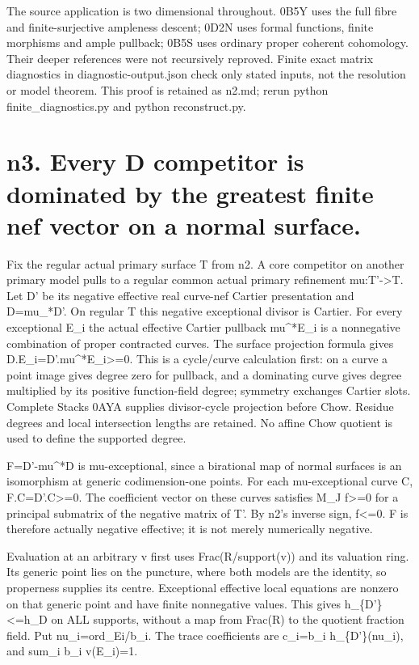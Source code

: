 \documentclass[11pt]{article}
\begin{document}
The source application is two dimensional throughout. 0B5Y uses the full fibre and finite-surjective ampleness descent; 0D2N uses formal functions, finite morphisms and ample pullback; 0B5S uses ordinary proper coherent cohomology. Their deeper references were not recursively reproved. Finite exact matrix diagnostics in diagnostic-output.json check only stated inputs, not the resolution or model theorem. This proof is retained as n2.md; rerun python finite\_diagnostics.py and python reconstruct.py.

\section*{n3. Every D competitor is dominated by the greatest finite nef vector on a normal surface.}
Fix the regular actual primary surface T from n2. A core competitor on another primary model pulls to a regular common actual primary refinement mu:T'->T. Let D' be its negative effective real curve-nef Cartier presentation and D=mu\_*D'. On regular T this negative exceptional divisor is Cartier. For every exceptional E\_i the actual effective Cartier pullback mu\textasciicircum{}*E\_i is a nonnegative combination of proper contracted curves. The surface projection formula gives D.E\_i=D'.mu\textasciicircum{}*E\_i>=0. This is a cycle/curve calculation first: on a curve a point image gives degree zero for pullback, and a dominating curve gives degree multiplied by its positive function-field degree; symmetry exchanges Cartier slots. Complete Stacks 0AYA supplies divisor-cycle projection before Chow. Residue degrees and local intersection lengths are retained. No affine Chow quotient is used to define the supported degree.

F=D'-mu\textasciicircum{}*D is mu-exceptional, since a birational map of normal surfaces is an isomorphism at generic codimension-one points. For each mu-exceptional curve C, F.C=D'.C>=0. The coefficient vector on these curves satisfies M\_J f>=0 for a principal submatrix of the negative matrix of T'. By n2's inverse sign, f<=0. F is therefore actually negative effective; it is not merely numerically negative.

Evaluation at an arbitrary v first uses Frac(R/support(v)) and its valuation ring. Its generic point lies on the puncture, where both models are the identity, so properness supplies its centre. Exceptional effective local equations are nonzero on that generic point and have finite nonnegative values. This gives h\_\{D'\}<=h\_D on ALL supports, without a map from Frac(R) to the quotient fraction field. Put nu\_i=ord\_Ei/b\_i. The trace coefficients are c\_i=b\_i h\_\{D'\}(nu\_i), and sum\_i b\_i v(E\_i)=1.
\end{document}
